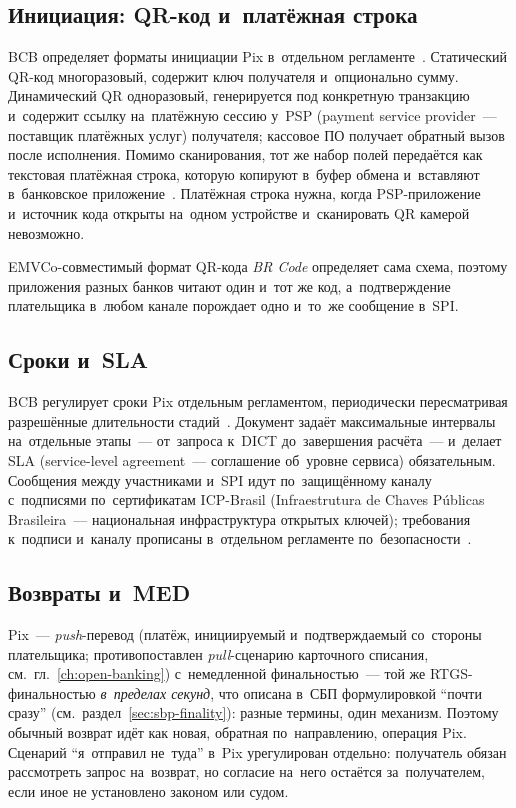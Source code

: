\subsection*{Инициация: QR-код и~платёжная строка}\label{subsec:pix-init}

BCB определяет форматы инициации Pix в~отдельном
регламенте~\cite{pix-manual-iniciacao}. Статический QR-код многоразовый,
содержит ключ получателя и~опционально сумму. Динамический QR одноразовый,
генерируется под конкретную транзакцию и~содержит ссылку на~платёжную сессию
у~PSP (payment service provider~--- поставщик платёжных услуг) получателя;
кассовое ПО получает обратный вызов после исполнения. Помимо
сканирования, тот же набор полей передаётся как текстовая платёжная строка,
которую копируют в~буфер обмена и~вставляют в~банковское
приложение~\cite{pix-faq}. Платёжная строка нужна, когда PSP-приложение
и~источник кода открыты на~одном устройстве и~сканировать QR камерой
невозможно.

EMVCo-совместимый формат QR-кода \textit{BR Code} определяет сама схема,
поэтому приложения разных банков читают один и~тот же код, а~подтверждение
плательщика в~любом канале порождает одно и~то~же сообщение в~SPI.

\subsection*{Сроки и~SLA}\label{subsec:pix-timings}

BCB регулирует сроки Pix отдельным регламентом, периодически пересматривая
разрешённые длительности стадий~\cite{pix-manual-tempos}. Документ задаёт
максимальные интервалы на~отдельные этапы~--- от~запроса к~DICT до~завершения
расчёта~--- и~делает SLA (service-level agreement~--- соглашение об~уровне
сервиса) обязательным. Сообщения между участниками и~SPI идут
по~защищённому каналу с~подписями по~сертификатам ICP-Brasil (Infraestrutura de
Chaves Públicas Brasileira~--- национальная инфраструктура открытых ключей);
требования к~подписи и~каналу прописаны в~отдельном регламенте
по~безопасности~\cite{pix-manual-seguranca}.

\subsection*{Возвраты и~MED}\label{subsec:pix-med}

Pix~--- \textit{push}-перевод (платёж, инициируемый и~подтверждаемый со~стороны
  плательщика; противопоставлен \textit{pull}-сценарию карточного списания,
см.~гл.~\ref{ch:open-banking}) с~немедленной финальностью~--- той же
RTGS-финальностью \emph{в~пределах секунд}, что описана в~СБП формулировкой
\enquote{почти сразу} (см.~раздел~\ref{sec:sbp-finality}): разные термины, один
механизм. Поэтому обычный возврат идёт как новая, обратная по~направлению,
операция Pix. Сценарий \enquote{я~отправил не~туда} в~Pix урегулирован отдельно:
получатель обязан рассмотреть запрос на~возврат, но согласие на~него остаётся
за~получателем, если иное не установлено законом или судом.

